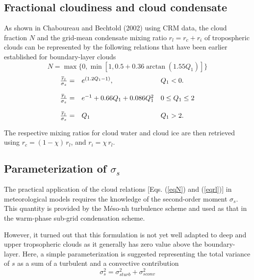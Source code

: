\subsection{Fractional cloudiness and cloud condensate}
As shown in Chaboureau and Bechtold (2002) using CRM data,
the cloud fraction $N$ and the
grid-mean condensate mixing ratio $r_l=r_c+r_i$ of tropospheric clouds
can be represented by the
following relations that have been earlier established for boundary-layer clouds
\begin{equation}
N =\max \{0, \min [1, 0.5 + 0.36 \arctan (1.55 Q_1)]\}
\label{eqN}
\end{equation}
\begin{equation}
\begin{array}{lll}
{\overline{r}_l\over\sigma_s}  = & e^{( 1.2Q_1-1 )}, & Q_1< 0. \\
& & \\
{\overline{r}_l\over\sigma_s}  = & e^{-1}+0.66 Q_1 +0.086Q_1^2 &0\le Q_1\le 2\\
& & \\
{\overline{r}_l\over\sigma_s}  = & Q_1 &Q_1>2.\\
\end{array}
\label{eqrl}
\end{equation}

The respective mixing ratios for cloud water and cloud ice  are then retrieved
using $r_c=(1-\chi)\,r_l$, and $r_i=\chi\,r_l$.

\subsection{Parameterization of $\sigma_s$}

The practical application of the cloud relations [Eqs. (\ref{eqN}) and (\ref{eqrl})]
in meteorological models requires the knowledge of the second-order moment
$\sigma_s$. This quantity is provided by the M\'eso-nh turbulence scheme and used
as that in the warm-phase sub-grid condensation scheme.

However, it turned out that this formulation is not yet well adapted
to deep and upper tropsopheric clouds as it generally has zero value above
the boundary-layer.
Here, a simple parameterization is suggested representing the total variance of $s$
as a sum of a turbulent and  a convective contribution
\begin{equation}
\sigma_s^2=\sigma_{sturb}^2+\sigma_{sconv}^2
\end{equation}

